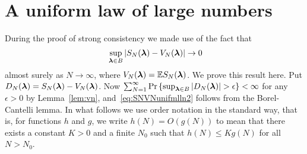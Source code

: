 \documentclass[aap,preprint]{imsart}
\newcommand{\prob}{\operatorname{Pr}}
\newcommand{\expect}{{\mathbb E}}
\newcommand{\abs}[1]{\left\vert #1 \right\vert}
\newcommand{\sabs}[1]{\vert #1 \vert}
\begin{document}
\appendix



\section{A uniform law of large numbers} \label{app:uniform-law-large}

During the proof of strong consistency we made use of the fact that
\begin{equation}~\label{eq:SNVNunifmlln2}
\sup_{\lambdabf \in B}\sabs{S_N(\lambdabf) - V_N(\lambdabf)} \rightarrow 0
\end{equation}
almost surely as $N\rightarrow\infty$, where $V_N(\lambdabf) = \expect S_N(\lambdabf)$.  We prove this result here.  Put $D_N(\boldsymbol{\lambda}) = S_N(\boldsymbol{\lambda}) - V_N(\boldsymbol{\lambda})$.  Now $\sum_{N=1}^\infty \prob \left\{ \sup_{\lambdabf \in B}\abs{ D_N(\lambdabf) } > \epsilon \right\} < \infty$ for any $\epsilon > 0$ by Lemma~\ref{lem:vn}, and~\eqref{eq:SNVNunifmlln2} follows from the Borel-Cantelli lemma.   In what follows we use order notation in the standard way, that is, for functions $h$ and $g$, we write $h(N) = O(g(N))$ to mean that there exists a constant $K > 0$ and a finite $N_0$ such that $h(N) \leq K g(N)$ for all $N > N_0$.
\end{document}
